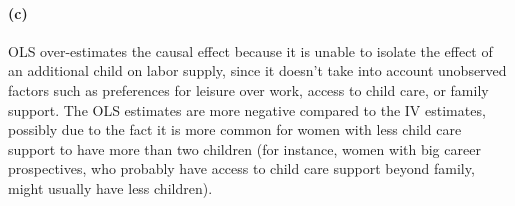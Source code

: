 \documentclass{scrartcl}
\begin{document}
\paragraph*{(c)}


OLS over-estimates the causal effect because it is unable to isolate the effect of an additional child on labor supply, since it doesn't take into account unobserved factors such as preferences for leisure over work, access to child care, or family support. The OLS estimates are more negative compared to the IV estimates, possibly due to the fact it is more common for women with less child care support to have more than two children (for instance, women with big career prospectives, who probably have access to child care support beyond family, might usually have less children). \\
\end{document}

